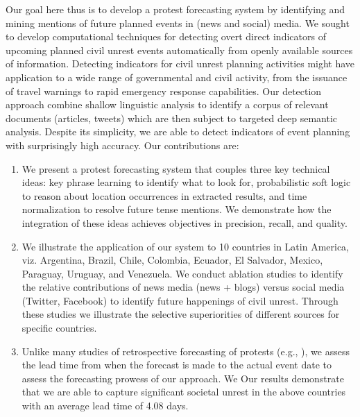Our goal here thus is to develop a protest forecasting system by identifying and mining mentions of future planned events
in (news and social) media.
We sought to develop
computational techniques for detecting overt direct indicators
of upcoming planned civil unrest events automatically from openly
available sources of information.  Detecting indicators for civil
unrest planning activities might have application to a wide range of
governmental and civil activity, from the issuance of travel warnings
to rapid emergency response capabilities.  
Our detection approach 
combine shallow linguistic analysis to identify a corpus of relevant
documents (articles, tweets) which are then subject to targeted deep semantic analysis.
Despite its simplicity, we are able to
detect indicators of event planning with surprisingly high
accuracy. 
Our contributions are:
\begin{enumerate}
\item We present a protest forecasting system that couples three key technical ideas:
key phrase learning to identify what to look for, probabilistic soft logic to reason about location occurrences in extracted results, and 
time normalization to resolve future tense mentions. We demonstrate how the integration of these ideas achieves objectives in precision,
recall, and quality.
\item We illustrate the application of our system to 10 countries in Latin America, viz. Argentina, Brazil, Chile, Colombia, Ecuador, El Salvador, Mexico, Paraguay, Uruguay, and Venezuela. 
We conduct ablation studies to identify the 
relative contributions of news media (news + blogs) versus social media (Twitter, Facebook) to identify future happenings of
civil unrest. Through these studies we illustrate the selective superiorities of different sources for specific countries.
\item Unlike many studies of retrospective forecasting of protests (e.g., ), we assess the lead time from when the forecast is made to
the actual event date to assess the forecasting prowess of our approach. We
Our results demonstrate that we are able to 
capture significant societal unrest in the above countries with an average lead time of 4.08 days. 
\end{enumerate}

